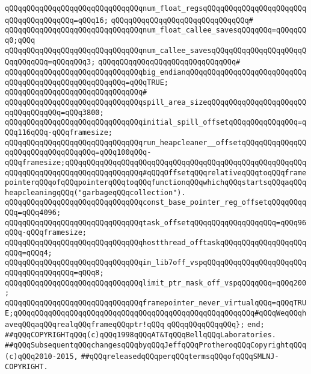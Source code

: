 \verb|qQQqqQQqqQQqqQQqqQQqqQQqqQQqqQQqnum_float_regsqQQqqQQqqQQqqQQqqQQqqQQqqQQqqQQqqQQqqQQq=qQQq16;|\newline
\verb|qQQqqQQqqQQqqQQqqQQqqQQqqQQqqQQq#|\newline
\verb|qQQqqQQqqQQqqQQqqQQqqQQqqQQqqQQqnum_float_callee_savesqQQqqQQq=qQQqqQQq0;qQQq|\newline
\verb|qQQqqQQqqQQqqQQqqQQqqQQqqQQqqQQqnum_callee_savesqQQqqQQqqQQqqQQqqQQqqQQqqQQqqQQq=qQQqqQQq3;|\newline
\verb|qQQqqQQqqQQqqQQqqQQqqQQqqQQqqQQq#|\newline
\verb|qQQqqQQqqQQqqQQqqQQqqQQqqQQqqQQqbig_endianqQQqqQQqqQQqqQQqqQQqqQQqqQQqqQQqqQQqqQQqqQQqqQQqqQQqqQQq=qQQqTRUE;|\newline
\verb|qQQqqQQqqQQqqQQqqQQqqQQqqQQqqQQq#|\newline
\verb|qQQqqQQqqQQqqQQqqQQqqQQqqQQqqQQqspill_area_sizeqQQqqQQqqQQqqQQqqQQqqQQqqQQqqQQqqQQq=qQQq3800;|\newline
\verb|qQQqqQQqqQQqqQQqqQQqqQQqqQQqqQQqinitial_spill_offsetqQQqqQQqqQQqqQQq=qQQq116qQQq-qQQqframesize;|\newline
\verb|qQQqqQQqqQQqqQQqqQQqqQQqqQQqqQQqrun_heapcleaner__offsetqQQqqQQqqQQqqQQqqQQqqQQqqQQqqQQqqQQq=qQQq100qQQq-qQQqframesize;qQQqqQQqqQQqqQQqqQQqqQQqqQQqqQQqqQQqqQQqqQQqqQQqqQQqqQQqqQQqqQQqqQQqqQQqqQQqqQQqqQQqqQQq#qQQqOffsetqQQqrelativeqQQqtoqQQqframepointerqQQqofqQQqpointerqQQqtoqQQqfunctionqQQqwhichqQQqstartsqQQqaqQQqheapcleaningqQQq("garbageqQQqcollection").|\newline
\verb|qQQqqQQqqQQqqQQqqQQqqQQqqQQqqQQqconst_base_pointer_reg_offsetqQQqqQQqqQQq=qQQq4096;|\newline
\newline
\verb|qQQqqQQqqQQqqQQqqQQqqQQqqQQqqQQqtask_offsetqQQqqQQqqQQqqQQqqQQq=qQQq96qQQq-qQQqframesize;|\newline
\verb|qQQqqQQqqQQqqQQqqQQqqQQqqQQqqQQqhostthread_offtaskqQQqqQQqqQQqqQQqqQQqqQQq=qQQq4;|\newline
\verb|qQQqqQQqqQQqqQQqqQQqqQQqqQQqqQQqin_lib7off_vspqQQqqQQqqQQqqQQqqQQqqQQqqQQqqQQqqQQqqQQq=qQQq8;|\newline
\verb|qQQqqQQqqQQqqQQqqQQqqQQqqQQqqQQqlimit_ptr_mask_off_vspqQQqqQQq=qQQq200;|\newline
\newline
\verb|qQQqqQQqqQQqqQQqqQQqqQQqqQQqqQQqframepointer_never_virtualqQQq=qQQqTRUE;qQQqqQQqqQQqqQQqqQQqqQQqqQQqqQQqqQQqqQQqqQQqqQQqqQQqqQQq#qQQqWeqQQqhaveqQQqaqQQqrealqQQqframeqQQqptr!qQQq|\newline
\verb|qQQqqQQqqQQqqQQq};|\newline
\verb|end;|\newline
\newline
\newline
\verb|##qQQqCOPYRIGHTqQQq(c)qQQq1998qQQqAT&TqQQqBellqQQqLaboratories.|\newline
\verb|##qQQqSubsequentqQQqchangesqQQqbyqQQqJeffqQQqProtheroqQQqCopyrightqQQq(c)qQQq2010-2015,|\newline
\verb|##qQQqreleasedqQQqperqQQqtermsqQQqofqQQqSMLNJ-COPYRIGHT.|\newline

